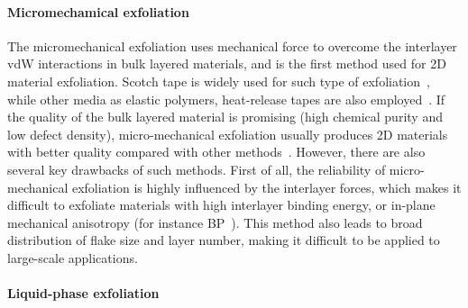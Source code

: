 \paragraph{Micro\-mechamical exfoliation}

The micro\-mechanical exfoliation uses mechanical force to overcome the
interlayer vdW interactions in bulk layered materials, and is the
first method used for 2D material exfoliation. Scotch tape is widely
used for such type of exfoliation~\cite{Novoselov_2004_gr}, while
other media as elastic polymers, heat-release tapes are also
employed~\cite{Favron_2015_BP_PDMS,Jain_2018_PDMS}. If the quality
of the bulk layered material is promising (\ie high chemical purity
and low defect density), micro-mechanical exfoliation usually produces
2D materials with better quality compared with other
methods~\cite{Lin_2019_gr_rev_growth}.
%
However, there are also several key drawbacks of such methods. First
of all, the reliability of micro-mechanical exfoliation is highly
influenced by the interlayer forces, which makes it difficult to
exfoliate materials with high interlayer binding energy, or in-plane
mechanical anisotropy (for instance
BP~\cite{Favron_2015_BP_PDMS,Liu_2017_aniso_BP}). This method also
leads to broad distribution of flake size and layer number, making it
difficult to be applied to large-scale applications.

\paragraph{Liquid-phase exfoliation}


